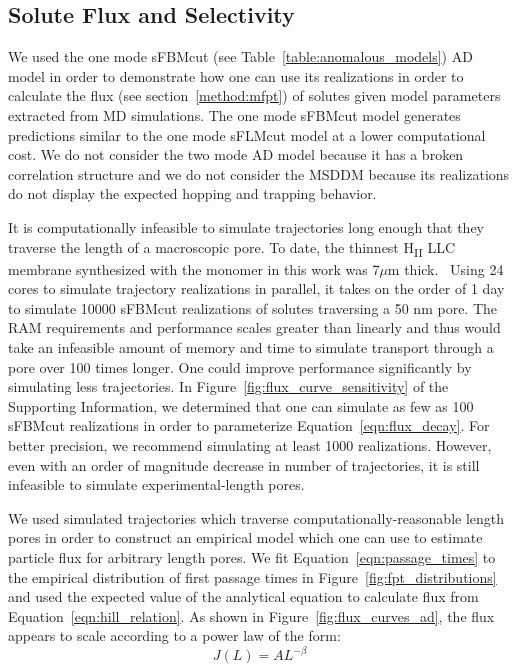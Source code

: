 \documentclass[journal=ancac3,manuscript=article,layout=twocolumn]{achemso}
\begin{document}
  \subsection{Solute Flux and Selectivity}\label{section:mfpt}
  
  We used the one mode sFBMcut (see Table~\ref{table:anomalous_models}) AD
  model in order to demonstrate how one can use its realizations in order to
  calculate the flux (see section~\ref{method:mfpt}) of solutes given model
  parameters extracted from MD simulations. The one mode sFBMcut model
  generates predictions similar to the one mode sFLMcut model at a lower
  computational cost. We do not consider the two mode AD model because it has a
  broken correlation structure and we do not consider the MSDDM because its
  realizations do not display the expected hopping and trapping behavior. 

  It is computationally infeasible to simulate trajectories long enough that
  they traverse the length of a macroscopic pore. To date, the thinnest
  H\textsubscript{II} LLC membrane synthesized with the monomer in this work
  was 7$\mu$m thick.~\cite{feng_thin_2016}
  Using 24 cores to simulate trajectory realizations in
  parallel, it takes on the order of 1 day to simulate 10000 sFBMcut
  realizations of solutes traversing a 50 nm pore. The RAM requirements and
  performance scales greater than linearly and thus would take an infeasible
  amount of memory and time to simulate transport through a pore over 100 times
  longer. One could improve performance significantly by simulating less
  trajectories. In Figure~\ref{fig:flux_curve_sensitivity} of the Supporting Information,
  we determined that one can simulate as few as 100 sFBMcut
  realizations in order to parameterize Equation~\ref{eqn:flux_decay}. For
  better precision, we recommend simulating at least 1000 realizations.
  However, even with an order of magnitude decrease in number of trajectories,
  it is still infeasible to simulate experimental-length pores.
  
  We used simulated trajectories which traverse computationally-reasonable
  length pores in order to construct an empirical model which one can use to
  estimate particle flux for arbitrary length pores. We fit
  Equation~\ref{eqn:passage_times} to the empirical distribution of first
  passage times in Figure~\ref{fig:fpt_distributions} and used the expected
  value of the analytical equation to calculate flux from
  Equation~\ref{eqn:hill_relation}. As shown in
  Figure~\ref{fig:flux_curves_ad}, the flux appears to scale according to a
  power law of the form:
  \begin{equation}
  J(L) = AL^{-\beta} 
  \label{eqn:flux_decay}
  \end{equation}
\end{document}
